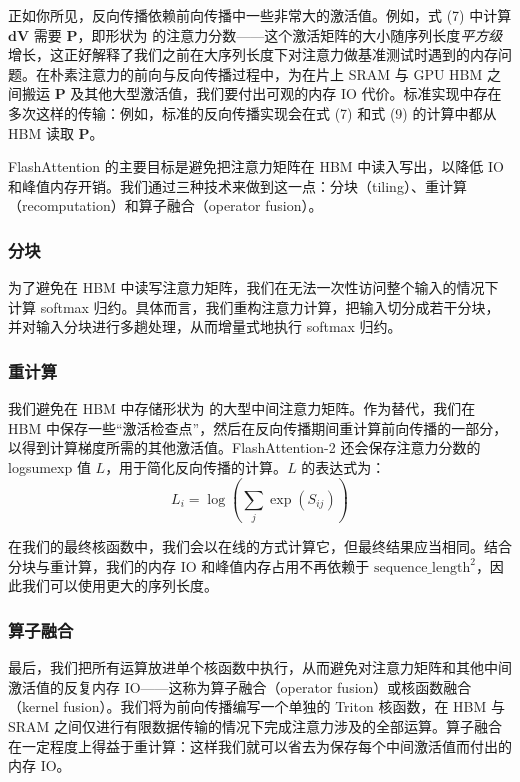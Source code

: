 正如你所见，反向传播依赖前向传播中一些非常大的激活值。例如，式 (7) 中计算 $\boldsymbol{dV}$ 需要 $\boldsymbol{P}$，即形状为  的注意力分数——这个激活矩阵的大小随序列长度\emph{平方级}增长，这正好解释了我们之前在大序列长度下对注意力做基准测试时遇到的内存问题。在朴素注意力的前向与反向传播过程中，为在片上 SRAM 与 GPU HBM 之间搬运 $\boldsymbol{P}$ 及其他大型激活值，我们要付出可观的内存 IO 代价。标准实现中存在多次这样的传输：例如，标准的反向传播实现会在式 (7) 和式 (9) 的计算中都从 HBM 读取 $\boldsymbol{P}$。

FlashAttention 的主要目标是避免把注意力矩阵在 HBM 中读入写出，以降低 IO 和峰值内存开销。我们通过三种技术来做到这一点：分块（tiling）、重计算（recomputation）和算子融合（operator fusion）。

\subsubsection*{分块}

为了避免在 HBM 中读写注意力矩阵，我们在无法一次性访问整个输入的情况下计算 softmax 归约。具体而言，我们重构注意力计算，把输入切分成若干分块，并对输入分块进行多趟处理，从而增量式地执行 softmax 归约。

\subsubsection*{重计算}

我们避免在 HBM 中存储形状为  的大型中间注意力矩阵。作为替代，我们在 HBM 中保存一些“激活检查点”，然后在反向传播期间重计算前向传播的一部分，以得到计算梯度所需的其他激活值。FlashAttention-2 还会保存注意力分数的 logsumexp 值 $L$，用于简化反向传播的计算。$L$ 的表达式为：
\begin{equation}
L_i = \log\left(\sum_j \exp(S_{ij})\right)
\end{equation}

在我们的最终核函数中，我们会以在线的方式计算它，但最终结果应当相同。结合分块与重计算，我们的内存 IO 和峰值内存占用不再依赖于 $\mathrm{sequence\_length}^2$，因此我们可以使用更大的序列长度。

\subsubsection*{算子融合}

最后，我们把所有运算放进单个核函数中执行，从而避免对注意力矩阵和其他中间激活值的反复内存 IO——这称为算子融合（operator fusion）或核函数融合（kernel fusion）。我们将为前向传播编写一个单独的 Triton 核函数，在 HBM 与 SRAM 之间仅进行有限数据传输的情况下完成注意力涉及的全部运算。算子融合在一定程度上得益于重计算：这样我们就可以省去为保存每个中间激活值而付出的内存 IO。

